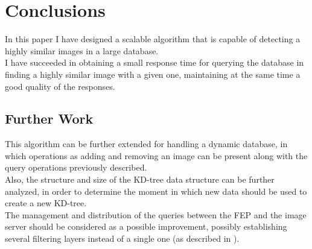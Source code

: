 \chapter{Conclusions}

In this paper I have designed a scalable algorithm that is capable of detecting a highly similar images in a large database.\\
I have succeeded in obtaining a small response time for querying the database in finding a highly similar image with a given one, maintaining at the same time a good quality of the responses.

\section {Further Work}
	This algorithm can be further extended for handling a dynamic database, in which operations as adding and removing an image can be present along with the query operations previously described.\\
	Also, the structure and size of the KD-tree data structure can be further analyzed, in order to determine the moment in which new data should be used to create a new KD-tree. \\
	The management and distribution of the queries between the FEP and the image server should be considered as a possible improvement, possibly establishing several filtering layers instead of a single one (as described in ).